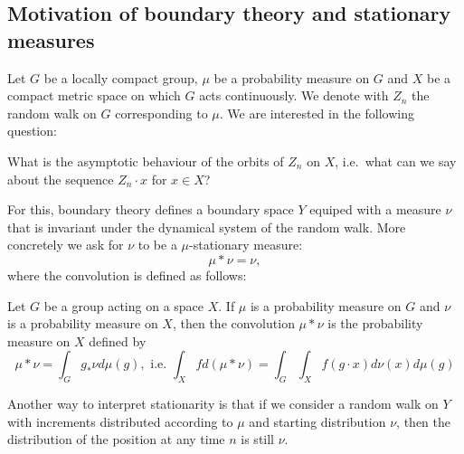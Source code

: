 \documentclass{report}
\begin{document}
\subsection{Motivation of boundary theory and stationary measures}
Let $G$ be a locally compact group, $\mu$ be a probability measure on $G$ and $X$ be a compact metric space on which $G$ acts continuously.
We denote with $Z_n$ the random walk on $G$ corresponding to $\mu$.
We are interested in the following question:
\begin{question}
    What is the asymptotic behaviour of the orbits of $Z_n$ on $X$, i.e.\ what can we say about the sequence $Z_n \cdot x$ for $x \in X$?
\end{question}
For this, boundary theory defines a boundary space $Y$ equiped with a measure $\nu$ that is invariant under the dynamical system of the random walk.
More concretely we ask for $\nu$ to be a $\mu$-stationary measure:
\[
\mu * \nu = \nu,
\]
where the convolution is defined as follows:
\begin{definition}
    Let $G$ be a group acting on a space $X$.
    If $\mu$ is a probability measure on $G$ and $\nu$ is a probability measure on $X$, then the convolution $\mu * \nu$ is the probability measure on $X$ defined by
    \[
    \mu * \nu = \int_G g_* \nu d\mu(g),\text{ i.e.\ } \int_X f d(\mu * \nu) = \int_G \int_X f(g \cdot x) d\nu(x) d\mu(g)
    \]
\end{definition}
Another way to interpret stationarity is that if we consider a random walk on $Y$ with increments distributed according to $\mu$ and starting distribution $\nu$, then the distribution of the position at any time $n$ is still $\nu$.
\end{document}
